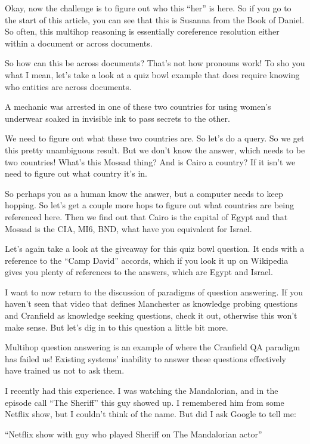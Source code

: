 Okay, now the challenge is to figure out who this “her” is here.  So if you go to the start of this article, you can see that this is Susanna from the Book of Daniel.  So often, this multihop reasoning is essentially coreference resolution either within a document or across documents.

So how can this be across documents?  That’s not how pronouns work!  To sho you what I mean, let’s take a look at a quiz bowl example that does require knowing who entities are across documents.

A mechanic was arrested in one of these two countries for using women's underwear soaked in invisible ink to pass secrets to the other.

We need to figure out what these two countries are.  So let’s do a query.  So we get this pretty unambiguous result.  But we don’t know the answer, which needs to be two countries!  What’s this Mossad thing?  And is Cairo a country?  If it isn’t we need to figure out what country it’s in.

So perhaps you as a human know the answer, but a computer needs to keep hopping.  So let’s get a couple more hops to figure out what countries are being referenced here.  Then we find out that Cairo is the capital of Egypt and that Mossad is the CIA, MI6, BND, what have you equivalent for Israel.  

Let’s again take a look at the giveaway for this quiz bowl question.  It ends with a reference to the “Camp David” accords, which if you look it up on Wikipedia gives you plenty of references to the answers, which are Egypt and Israel.  

I want to now return to the discussion of paradigms of question answering.  If you haven’t seen that video that defines Manchester as knowledge probing questions and Cranfield as knowledge seeking questions, check it out, otherwise this won’t make sense.  But let’s dig in to this question a little bit more.

Multihop question answering is an example of where the Cranfield QA paradigm has failed us!  Existing systems’ inability to answer these questions effectively have trained us not to ask them.  

I recently had this experience.  I was watching the Mandalorian, and in the episode call “The Sheriff” this guy showed up.  I remembered him from some Netflix show, but I couldn’t think of the name.  But did I ask Google to tell me:

“Netflix show with guy who played Sheriff on The Mandalorian actor”

